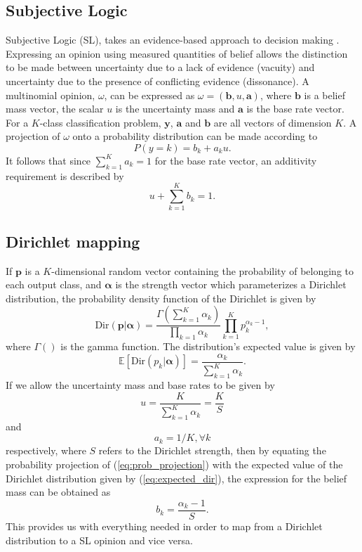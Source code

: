 \documentclass[
twocolumn,
]{ceurart}
\begin{document}
\subsection{Subjective Logic}
Subjective Logic (SL), takes an evidence-based approach to decision making \cite{Josang2016}.
Expressing an opinion using measured quantities of belief allows the distinction to be made between uncertainty due to a lack of evidence (vacuity) and uncertainty due to the presence of conflicting evidence (dissonance).
A multinomial opinion, $\omega$, can be expressed as $\omega=\left(\mathbf{b}, u, \mathbf{a}\right)$, where $\mathbf{b}$ is a belief mass vector, the scalar $u$ is the uncertainty mass and $\mathbf{a}$ is the base rate vector.
For a $K$-class classification problem, $\mathbf{y}$, $\mathbf{a}$ and $\mathbf{b}$ are all vectors of dimension $K$.
A projection of $\omega$ onto a probability distribution can be made according to
\begin{equation}
  P(y=k) = b_k + a_ku.
  \label{eq:prob_projection}
\end{equation}
It follows that since $\sum_{k=1}^Ka_k=1$ for the base rate vector, an additivity requirement is described by
\begin{equation}
    u+\sum_{k=1}^K b_k=1.
\end{equation}

\subsection{Dirichlet mapping}
If $\mathbf{p}$ is a $K$-dimensional random vector containing the probability of belonging to each output class, and $\boldsymbol{\alpha}$ is the strength vector which parameterizes a Dirichlet distribution, the probability density function of the Dirichlet is given by
\begin{equation}
    \textrm{Dir}(\mathbf{p}|\boldsymbol{\alpha})= \frac{\Gamma(\sum_{k=1}^K\alpha_k)}{\prod_{k=1}\alpha_k}\prod_{k=1}^Kp_k^{\alpha_k-1},
\end{equation}
where $\Gamma()$ is the gamma function.
The distribution's expected value is given by
\begin{equation}
\mathbb{E}\left[\textrm{Dir}(p_k\vert\boldsymbol{\alpha})\right]=\frac{\alpha_k}{\sum_{k=1}^K\alpha_k}.
\label{eq:expected_dir}
\end{equation}
If we allow the uncertainty mass and base rates to be given by
\begin{equation}
    u=\frac{K}{\sum_{k=1}^K\alpha_k}=\frac{K}{S}
\end{equation}
and
\begin{equation}
    a_k=1/K, \forall k
\end{equation}
respectively, where $S$ refers to the Dirichlet strength, then by equating the probability projection of (\ref{eq:prob_projection}) with the expected value of the Dirichlet distribution given by (\ref{eq:expected_dir}), the expression for the belief mass can be obtained as
\begin{equation}
    b_k = \frac{\alpha_k-1}{S}.
\end{equation}
This provides us with everything needed in order to map from a Dirichlet distribution to a SL opinion and vice versa.
\end{document}
